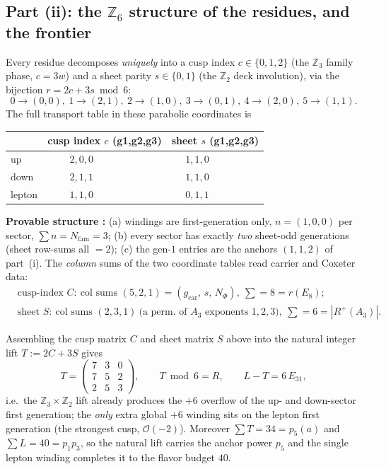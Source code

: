 \documentclass[11pt,a4paper]{article}
\newcommand{\gcar}{g_{\mathrm{car}}}
\newcommand{\Nfam}{N_{\mathrm{fam}}}
\theoremstyle{definition}
\begin{document}
\subsection{Part (ii): the $\mathbb Z_6$ structure of the residues, and the frontier}
Every residue decomposes \emph{uniquely} into a cusp index $c\in\{0,1,2\}$ (the $\mathbb Z_3$ family
phase, $c=3w$) and a sheet parity $s\in\{0,1\}$ (the $\mathbb Z_2$ deck involution), via the bijection
$r=2c+3s\bmod 6$:
\[
  0\!\to\!(0,0),\ 1\!\to\!(2,1),\ 2\!\to\!(1,0),\ 3\!\to\!(0,1),\ 4\!\to\!(2,0),\ 5\!\to\!(1,1).
\]
The full transport table in these parabolic coordinates is
\begin{center}\small
\begin{tabular}{l|ccc|ccc}
\toprule
 & \multicolumn{3}{c|}{cusp index $c$ (g1,g2,g3)} & \multicolumn{3}{c}{sheet $s$ (g1,g2,g3)} \\
\midrule
up     & $2,0,0$ & & & $1,1,0$ & & \\
down   & $2,1,1$ & & & $1,1,0$ & & \\
lepton & $1,1,0$ & & & $0,1,1$ & & \\
\bottomrule
\end{tabular}
\end{center}
\textbf{Provable structure \mE:} (a) windings are first-generation only, $n=(1,0,0)$ per sector,
$\sum n=\Nfam=3$; (b) every sector has exactly \emph{two} sheet-odd generations (sheet row-sums all
$=2$); (c) the gen-$1$ entries are the anchors $(1,1,2)$ of part~(i). The \emph{column} sums of the two
coordinate tables read carrier and Coxeter data:
\begin{equation}
\begin{aligned}
  &\text{cusp-index } C\!:\ \text{col sums }(5,2,1)=(\gcar,\,s,\,N_\Phi),\ \textstyle\sum=8=r(E_8);\\
  &\text{sheet } S\!:\ \text{col sums }(2,3,1)\ \text{(a perm.\ of }A_3\text{ exponents }1,2,3),\ \textstyle\sum=6=|R^+(A_3)| .
\end{aligned}\tag{$\ast$}
\end{equation}

\begin{keybox}
Assembling the cusp matrix $C$ and sheet matrix $S$ above into the natural integer lift
$T:=2C+3S$ gives
\[
  T=\begin{pmatrix}7&3&0\\7&5&2\\2&5&3\end{pmatrix},\qquad
  T\bmod 6=R,\qquad L-T=6\,E_{31},
\]
i.e.\ the $\mathbb Z_3\times\mathbb Z_2$ lift already produces the $+6$ overflow of the up- and
down-sector first generation; the \emph{only} extra global $+6$ winding sits on the lepton first
generation (the strongest cusp, $\mathcal O(-2)$). Moreover $\sum T=34=p_5(a)$ and $\sum L=40=p_1p_3$, so
the natural lift carries the anchor power $p_5$ and the single lepton winding completes it to the flavor
budget $40$. \mE
\end{keybox}
\end{document}
